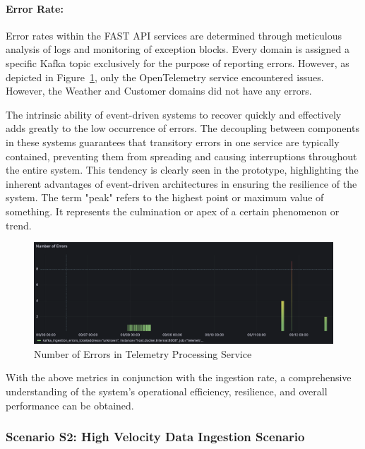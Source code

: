 \documentclass[journal]{IEEEtran}
\begin{document}
\paragraph{Error Rate:}

Error rates within the FAST API services are determined through meticulous analysis of logs and monitoring of exception blocks. Every domain is assigned a specific Kafka topic exclusively for the purpose of reporting errors. However, as depicted in Figure~\ref{numberOfErrorsInTelemetryProcessingService}, only the OpenTelemetry service encountered issues. However, the Weather and Customer domains did not have any errors.

The intrinsic ability of event-driven systems to recover quickly and effectively adds greatly to the low occurrence of errors. The decoupling between components in these systems guarantees that transitory errors in one service are typically contained, preventing them from spreading and causing interruptions throughout the entire system. This tendency is clearly seen in the prototype, highlighting the inherent advantages of event-driven architectures in ensuring the resilience of the system. The term "peak" refers to the highest point or maximum value of something. It represents the culmination or apex of a certain phenomenon or trend.

\begin{figure}
  \centering
  \includegraphics[width=\columnwidth]{images/number-of-errors-in-telemetry-processing-service.png}
  \caption{Number of Errors in Telemetry Processing Service}
  \label{numberOfErrorsInTelemetryProcessingService}
\end{figure}

With the above metrics in conjunction with the ingestion rate, a comprehensive understanding of the system's operational efficiency, resilience, and overall performance can be obtained.

\subsubsection{Scenario S2: High Velocity Data Ingestion Scenario}
\end{document}
